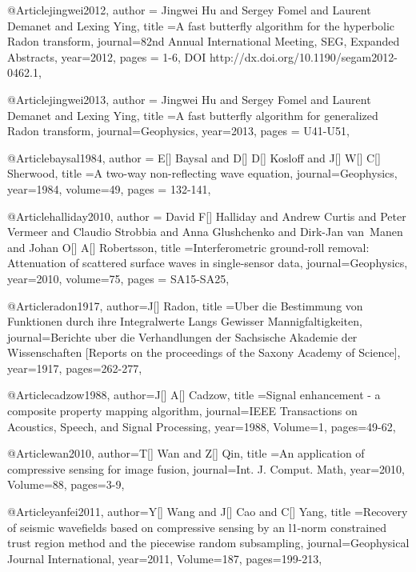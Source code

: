 @Article{jingwei2012,
  author = {Jingwei Hu and Sergey Fomel and Laurent Demanet and Lexing Ying},
  title ={A fast butterfly algorithm for the hyperbolic Radon transform},
  journal={82nd Annual International Meeting, SEG, Expanded Abstracts},
  year=2012,
  pages = {1-6, DOI http://dx.doi.org/10.1190/segam2012-0462.1},
}

@Article{jingwei2013,
  author = {Jingwei Hu and Sergey Fomel and Laurent Demanet and Lexing Ying},
  title ={A fast butterfly algorithm for generalized Radon transform},
  journal={Geophysics},
  year=2013,
  pages = {U41-U51},
}

@Article{baysal1984,
  author = {E[] Baysal and D[] D[] Kosloff and J[] W[] C[] Sherwood},
  title ={A two-way non-reflecting wave equation},
  journal={Geophysics},
  year=1984,
  volume={49},
  pages = {132-141},
}



@Article{halliday2010,
  author = {David F[] Halliday and Andrew Curtis and Peter Vermeer and Claudio Strobbia and Anna Glushchenko and Dirk-Jan van~Manen and Johan O[] A[] Robertsson},
  title ={Interferometric ground-roll removal: Attenuation of scattered surface waves in single-sensor data},
  journal={Geophysics},
  year=2010,
  volume={75},
  pages = {SA15-SA25},
}

@Article{radon1917,
  author={J[] Radon},
  title ={Uber die Bestimmung von Funktionen durch ihre Integralwerte Langs Gewisser Mannigfaltigkeiten},
  journal={Berichte uber die Verhandlungen der Sachsische Akademie der Wissenschaften [Reports on the proceedings of the Saxony Academy of Science]},
  year=1917,
  pages={262-277},
}

@Article{cadzow1988,
  author={J[] A[] Cadzow},
  title ={Signal enhancement - a composite property mapping algorithm},
  journal={IEEE Transactions on Acoustics, Speech, and Signal Processing},
  year=1988,
  Volume=1,
  pages={49-62},
}

@Article{wan2010,
  author={T[] Wan and Z[] Qin},
  title ={An application of compressive sensing for image fusion},
  journal={Int. J. Comput. Math},
  year=2010,
  Volume=88,
  pages={3-9},
}

@Article{yanfei2011,
  author={Y[] Wang and J[] Cao and C[] Yang},
  title ={Recovery of seismic wavefields based on compressive sensing by an l1-norm constrained trust region method and the piecewise random subsampling},
  journal={Geophysical Journal International},
  year=2011,
  Volume=187,
  pages={199-213},
}


